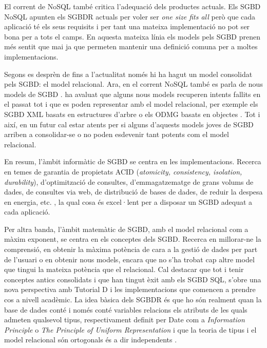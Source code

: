 El corrent de NoSQL també critica l'adequació dels productes actuals.
Els SGBD NoSQL apunten els SGBDR actuals per voler ser \emph{one size fits all} \parencite{stonebraker07,stonebraker09} però que cada aplicació té els seus requisits i per tant una mateixa implementació no pot ser bona per a tots el camps.
En aquesta mateixa línia els models pels SGBD prenen més sentit que mai ja que permeten mantenir una definició comuna per a moltes implementacions.


Segons es desprèn de \textcite{date06} fins a l'actualitat només hi ha hagut un model consolidat pels SGBD: el model relacional. 
Ara, en el corrent NoSQL també es parla de nous models de SGBD \parencite{edlich:nosql,stonebraker09:scidb}.
\citeauthor{date06} ha avaluat que alguns nous models recuperen intents fallits en el passat tot i que es poden representar amb el model relacional, per exemple els SGBD XML basats en estructures d'arbre \parencite[cap.~14]{date06} o els ODMG basats en objectes \parencite[cap.~27]{date06}. Tot i així, en un futur cal estar atents per si alguns d'aquests models joves de SGBD arriben a consolidar-se o no poden esdevenir tant potents com el model relacional.


En resum, l'àmbit informàtic de SGBD se centra en les implementacions. Recerca en temes de garantia de propietats ACID (\emph{atomicity, consistency, isolation, durability}), d'optimització de consultes, d'emmagatzematge de grans volums de dades, de consultes via web, de distribució de bases de dades, de reduir la despesa en energia, etc. \parencite{stonebraker07,stonebraker10}, la qual cosa és excel·lent per a disposar un SGBD adequat a cada aplicació. 

Per altra banda, l'àmbit matemàtic de SGBD, amb el model relacional com a màxim exponent, se centra en els conceptes dels SGBD. Recerca en millorar-ne la comprensió, en obtenir la màxima potència de cara a la gestió de dades per part de l'usuari o en obtenir nous models, encara que  no s'ha trobat cap altre model que tingui la mateixa potència que el relacional. Cal destacar que tot i tenir conceptes antics consolidats i que han tingut èxit amb els SGBD SQL, s'obre una nova perspectiva amb Tutorial D i les implementacions que comencen a prendre cos  a nivell acadèmic. La idea bàsica dels SGBDR és que ho són realment quan la base de dades conté i només conté variables relacions els atributs de les quals admeten qualsevol tipus, respectivament definit per Date com a \emph{Information Principle} o \emph{The Principle of Uniform Representation} \parencite{date:dictionary} i que la teoria de tipus i el model relacional són ortogonals és a dir independents \parencite[cap.~6]{date06}.


